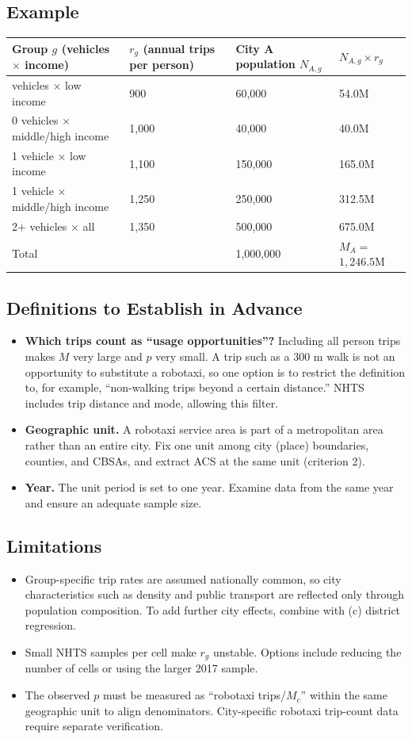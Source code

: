 \documentclass[10pt,a4paper]{article}
\begin{document}
\subsection{Example}
{\small
\begin{longtable}{@{}L{0.31\textwidth}L{0.24\textwidth}L{0.23\textwidth}L{0.16\textwidth}@{}}
\toprule Group $g$ (vehicles $\times$ income) & $r_g$ (annual trips per person) & City A population $N_{A,g}$ & $N_{A,g}\times r_g$\\\midrule\endhead\bottomrule{} vehicles $\times$ low income & 900 & 60,000 & 54.0M\\
0 vehicles $\times$ middle/high income & 1,000 & 40,000 & 40.0M\\
1 vehicle $\times$ low income & 1,100 & 150,000 & 165.0M\\
1 vehicle $\times$ middle/high income & 1,250 & 250,000 & 312.5M\\
2+ vehicles $\times$ all & 1,350 & 500,000 & 675.0M\\\midrule
Total & & 1,000,000 & $M_A=$\newline $1{,}246.5\mathrm{M}$\\
\end{longtable}}
\subsection{Definitions to Establish in Advance}
\begin{itemize}
\item \textbf{Which trips count as ``usage opportunities''?} Including all person trips makes $M$ very large and $p$ very small. A trip such as a 300 m walk is not an opportunity to substitute a robotaxi, so one option is to restrict the definition to, for example, ``non-walking trips beyond a certain distance.'' NHTS includes trip distance and mode, allowing this filter.
\item \textbf{Geographic unit.} A robotaxi service area is part of a metropolitan area rather than an entire city. Fix one unit among city (place) boundaries, counties, and CBSAs, and extract ACS at the same unit (criterion 2).
\item \textbf{Year.} The unit period is set to one year. Examine data from the same year and ensure an adequate sample size.
\end{itemize}
\subsection{Limitations}
\begin{itemize}
\item Group-specific trip rates are assumed nationally common, so city characteristics such as density and public transport are reflected only through population composition. To add further city effects, combine with (c) district regression.
\item Small NHTS samples per cell make $r_g$ unstable. Options include reducing the number of cells or using the larger 2017 sample.
\item The observed $p$ must be measured as ``robotaxi trips/$M_c$'' within the same geographic unit to align denominators. City-specific robotaxi trip-count data require separate verification.
\end{itemize}
\end{document}
